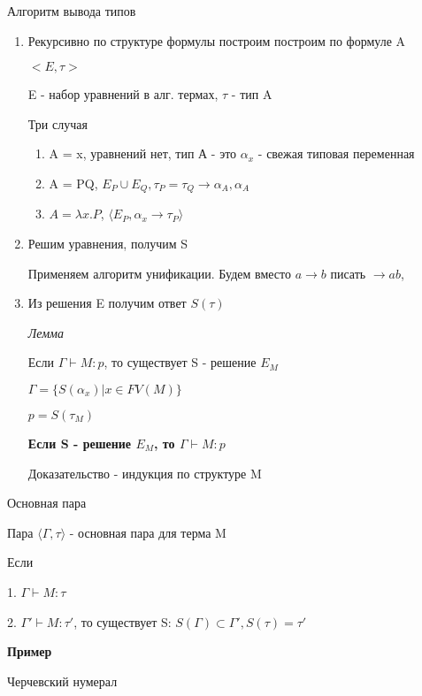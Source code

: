 
\begin{para}{Алгоритм вывода типов}

\begin{enumerate}

  \item Рекурсивно по структуре формулы построим построим по формуле A

  $<E, \tau>$

  E - набор уравнений в алг. термах, $\tau$ - тип A

  Три случая

	\begin{enumerate}

  	  \item A = x, уравнений нет, тип А - это $\alpha_x$ - свежая типовая переменная

 	  \item A = PQ, $E_P \cup E_Q, \tau_P = \tau_Q \rightarrow \alpha_A, \alpha_A$
 
 	  \item $A = \lambda x.P$, $\langle E_P, \alpha_x \rightarrow \tau_P \rangle$

	\end{enumerate}

  \item Решим уравнения, получим S
  
  Применяем алгоритм унификации. Будем вместо $a \rightarrow b$ писать $\rightarrow a b$, 

  \item Из решения E получим ответ $S(\tau)$
  
  \textit{Лемма}
  
  Если $\Gamma \vdash M : p$, то существует S - решение $E_M$
  
  $\Gamma = \{ S(\alpha_x) | x \in FV(M) \}$
  
  $p = S(\tau_M)$
  
  \textbf{Если S - решение $E_M$, то $\Gamma \vdash M : p$}
  
  Доказательство - индукция по структуре M

\end{enumerate}

\begin{defe}{Основная пара}

Пара $\langle \Gamma, \tau \rangle$ - основная пара для терма M

Если

1. $ \Gamma \vdash M : \tau$

2. $\Gamma' \vdash M : \tau'$, то существует S: $S(\Gamma) \subset \Gamma', S(\tau) = \tau'$

\end{defe}

\textbf{Пример}

Черчевский нумерал

\end{para}


